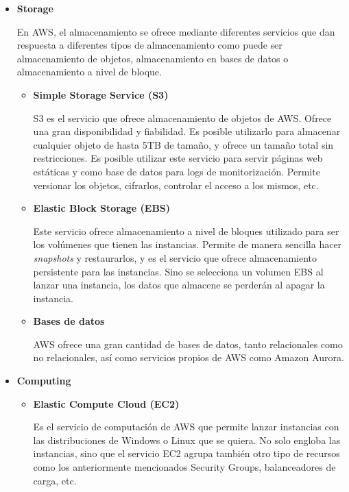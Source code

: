 \documentclass[../../memoria.tex]{subfiles}
\begin{document}
\begin{itemize}
    \item \textbf{Storage}
          \par
          En AWS, el almacenamiento se ofrece mediante diferentes servicios que dan respuesta a diferentes tipos de almacenamiento como puede ser almacenamiento de objetos, almacenamiento en bases de datos o almacenamiento a nivel de bloque.
          \begin{itemize}
              \item \textbf{Simple Storage Service (S3)}
                    \par
                    S3 es el servicio que ofrece almacenamiento de objetos de AWS. Ofrece una gran disponibilidad y fiabilidad. Es posible utilizarlo para almacenar cualquier objeto de hasta 5TB de tamaño, y ofrece un tamaño total sin restricciones. Es posible utilizar este servicio para servir páginas web estáticas y como base de datos para logs de monitorización. Permite versionar los objetos, cifrarlos, controlar el acceso a los mismos, etc.
              \item \textbf{Elastic Block Storage (EBS)}
                    \par
                    Este servicio ofrece almacenamiento a nivel de bloques utilizado para ser los volúmenes que tienen las instancias. Permite de manera sencilla hacer \textit{snapshots} y restaurarlos, y es el servicio que ofrece almacenamiento persistente para las instancias. Sino se selecciona un volumen EBS al lanzar una instancia, los datos que almacene se perderán al apagar la instancia.
              \item \textbf{Bases de datos}
                    \par
                    AWS ofrece una gran cantidad de bases de datos, tanto relacionales como no relacionales, así como servicios propios de AWS como Amazon Aurora.
          \end{itemize}

    \item \textbf{Computing}
          \begin{itemize}
              \item \textbf{Elastic Compute Cloud (EC2)}
                    \par
                    Es el servicio de computación de AWS que permite lanzar instancias con las distribuciones de Windows o Linux que se quiera. No solo engloba las instancias, sino que el servicio EC2 agrupa también otro tipo de recursos como los anteriormente mencionados Security Groups, balanceadores de carga, etc.
          \end{itemize}


\end{itemize}
\end{document}

